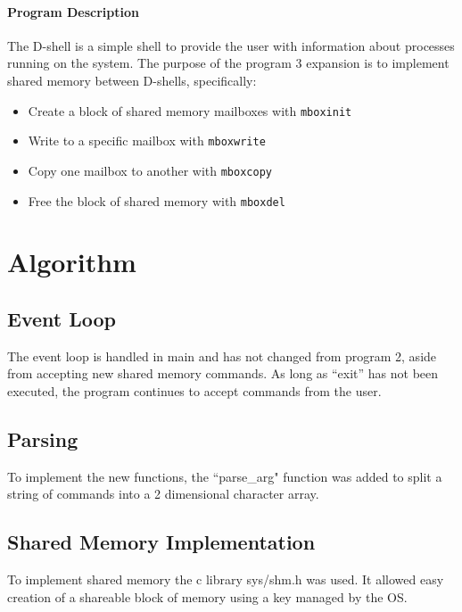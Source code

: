 \documentclass[11pt]{article}
\begin{document}
\maketitle


\begin{multicols}{2}

\paragraph{Program Description}
The D-shell is a simple shell to provide the user with information about processes running on the system. The purpose of the program 3 expansion is to implement shared memory between D-shells, specifically:
\begin{itemize}
\item 	Create a block of shared memory mailboxes with \texttt{mboxinit}

\item	Write to a specific mailbox with \texttt{mboxwrite}

\item	Copy one mailbox to another with \texttt{mboxcopy}

\item	Free the block of shared memory with \texttt{mboxdel}
\end{itemize}

\section{Algorithm}\label{algorithm}
\subsection{Event Loop}\label{event_loop}
The event loop is handled in main and has not changed from program 2, aside from accepting new shared memory commands. As long as ``exit'' has not been executed, the program continues to accept commands from the user. 

\subsection{Parsing}
To implement the new functions, the ``parse\_arg" function was added to split a string of commands into a 2 dimensional character array.

\subsection{Shared Memory Implementation}
To implement shared memory the c library sys/shm.h was used. It allowed easy creation of a shareable block of memory using a key managed by the OS. 


\end{multicols}
\end{document}
